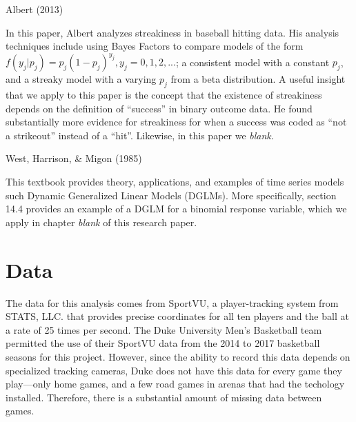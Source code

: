 \documentclass[12pt,twoside]{dukestatscithesis}
\theoremstyle{definition}
\theoremstyle{definition}
\theoremstyle{definition}
\theoremstyle{remark}
\begin{document}
Albert (2013)

In this paper, Albert analyzes streakiness in baseball hitting data. His
analysis techniques include using Bayes Factors to compare models of the
form \(f(y_j|p_j) = p_j(1-p_j)^{y_j}, y_j = 0,1,2,...\); a consistent
model with a constant \(p_j\), and a streaky model with a varying
\(p_j\) from a beta distribution. A useful insight that we apply to this
paper is the concept that the existence of streakiness depends on the
definition of ``success'' in binary outcome data. He found substantially
more evidence for streakiness for when a success was coded as ``not a
strikeout'' instead of a ``hit''. Likewise, in this paper we
\emph{blank}.

West, Harrison, \& Migon (1985)

This textbook provides theory, applications, and examples of time series
models such Dynamic Generalized Linear Models (DGLMs). More
specifically, section 14.4 provides an example of a DGLM for a binomial
response variable, which we apply in chapter \emph{blank} of this
research paper.

\chapter{Data}\label{data}

The data for this analysis comes from SportVU, a player-tracking system
from STATS, LLC. that provides precise coordinates for all ten players
and the ball at a rate of 25 times per second. The Duke University Men's
Basketball team permitted the use of their SportVU data from the 2014 to
2017 basketball seasons for this project. However, since the ability to
record this data depends on specialized tracking cameras, Duke does not
have this data for every game they play---only home games, and a few
road games in arenas that had the techology installed. Therefore, there
is a substantial amount of missing data between games.
\end{document}
